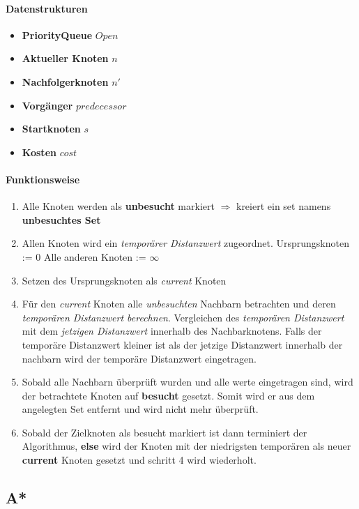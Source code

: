\paragraph{Datenstrukturen}
\begin{itemize}
	\item \textbf{PriorityQueue} $Open$
	\item \textbf{Aktueller Knoten} $n$
	\item \textbf{Nachfolgerknoten} $n'$
	\item \textbf{Vorgänger} $predecessor$
	\item \textbf{Startknoten} $s$
	\item \textbf{Kosten} $cost$
\end{itemize}
\paragraph{Funktionsweise}
\begin{enumerate}
	\item Alle Knoten werden als \textbf{unbesucht} markiert $\Rightarrow$ kreiert ein set namens \textbf{unbesuchtes Set}
	\item Allen Knoten wird ein \textit{temporärer Distanzwert} zugeordnet.
	\subitem Ursprungsknoten := 0
	\subitem Alle anderen Knoten := $\infty$
	\item Setzen des Ursprungsknoten als \textit{current} Knoten
	\item Für den \textit{current} Knoten alle \textit{unbesuchten} Nachbarn betrachten und deren \textit{temporären Distanzwert berechnen}.
	Vergleichen des \textit{temporären Distanzwert} mit dem \textit{jetzigen Distanzwert} innerhalb des Nachbarknotens.
	Falls der temporäre Distanzwert kleiner ist als der jetzige Distanzwert innerhalb der nachbarn wird der temporäre Distanzwert eingetragen.
	\item Sobald alle Nachbarn überprüft wurden und alle werte eingetragen sind, wird der betrachtete Knoten auf \textbf{besucht} gesetzt. Somit wird er aus dem angelegten Set entfernt und wird nicht mehr überprüft.
	\item Sobald der Zielknoten als besucht markiert ist dann terminiert der Algorithmus, \textbf{else} wird der Knoten mit der niedrigsten temporären als neuer \textbf{current} Knoten gesetzt und schritt 4 wird wiederholt.
\end{enumerate}

\subsection{A*}
